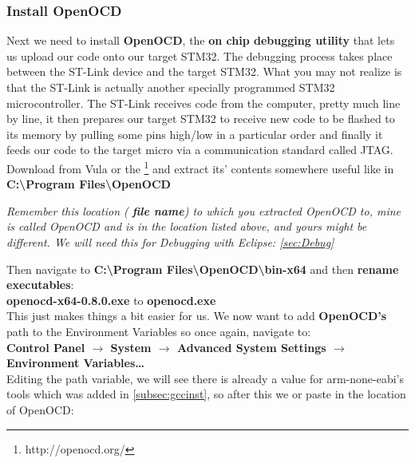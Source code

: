 \subsubsection{Install OpenOCD}
\label{Inst:OpenOCD}
Next we need to install \textbf{\color{Brown} OpenOCD}, the \textbf{on chip debugging utility} that lets us upload our code onto our target STM32. The debugging process takes place between the ST-Link device and the target STM32. What you may not realize is that the ST-Link is actually another specially programmed STM32 microcontroller. The  ST-Link receives code from the computer, pretty much line by line, it then prepares our target STM32 to receive new code to be flashed to its memory by pulling some pins high/low in a particular order and finally it feeds our code to the target micro via a communication standard called JTAG.
\\
Download \href{https://vula.uct.ac.za/x/sRNwF6}{\color{Blue}\underline{}} from Vula or the \href{http://openocd.org/}{\color{Blue}\underline{}}\footnote{http://openocd.org/} and extract its' contents somewhere useful like in \textbf{\color{Aquamarine} C:\textbackslash Program Files\textbackslash OpenOCD}
\par
\emph{\color{Gray} Remember this location (\textbf{\color{Aquamarine} file name}) to which you extracted OpenOCD to, mine is called OpenOCD and is in the location listed above, and yours might be different. We will need this for Debugging with Eclipse: \ref{sec:Debug}}
\par
Then navigate to \textbf{\color{Aquamarine}C:\textbackslash Program Files\textbackslash OpenOCD\textbackslash bin-x64} and then \textbf{\color{Purple} rename executables}:
\\
\textbf{\color{Brown}openocd-x64-0.8.0.exe} to \textbf{\color{Brown}openocd.exe}
\\
This just makes things a bit easier for us. We now want to add \textbf{\color{Brown} OpenOCD's} path to the Environment Variables so once again, navigate to:\\
\textbf{\color{Green} Control Panel $\rightarrow$ System $\rightarrow$ Advanced System Settings $\rightarrow$ Environment Variables\ldots}
\\
Editing the path variable, we will see there is already a value for arm-none-eabi's tools which was added in \ref{subsec:gccinst}, so after this we \underline{} or paste in the location of OpenOCD:
\\
\underline{}
